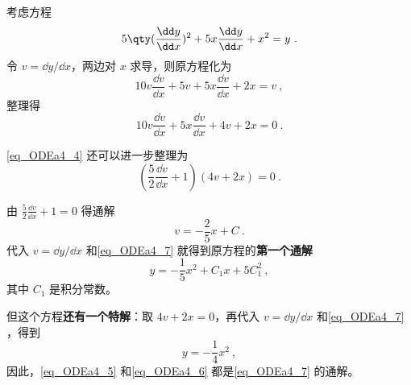 \begin{example}{}\label{ex_ODEa4_1}
考虑方程
\begin{equation}\label{eq_ODEa4_7}
5\qty(\frac{\dd y}{\dd x})^2+5x\frac{\dd y}{\dd x}+x^2=y~.
\end{equation}
令 $v=\dd y/\dd x$，两边对 $x$ 求导，则原方程化为
\begin{equation}\label{eq_ODEa4_8}
10v\frac{\dd v}{\dd x}+5v+5x\frac{\dd v}{\dd x}+2x=v~,
\end{equation}
整理得
\begin{equation}\label{eq_ODEa4_4}
10v\frac{\dd v}{\dd x}+5x\frac{\dd v}{\dd x}+4v+2x=0~.
\end{equation}

\autoref{eq_ODEa4_4} 还可以进一步整理为
\begin{equation}
(\frac{5}{2}\frac{\dd v}{\dd x}+1)(4v+2x)=0~.
\end{equation}

由 $\frac{5}{2}\frac{\dd v}{\dd x}+1=0$ 得通解
\begin{equation}\label{eq_ODEa4_9}
v=-\frac{2}{5}x+C~.
\end{equation}
代入 $v=\dd y/\dd x$ 和\autoref{eq_ODEa4_7} 就得到原方程的\textbf{第一个通解}
\begin{equation}\label{eq_ODEa4_5}
y=-\frac{1}{5}x^2+C_1x+5C_1^2~,
\end{equation}
其中 $C_1$ 是积分常数。

但这个方程\textbf{还有一个特解}：取 $4v+2x=0$，再代入 $v=\dd y/\dd x$ 和\autoref{eq_ODEa4_7} ，得到
\begin{equation}\label{eq_ODEa4_6}
y=-\frac{1}{4}x^2~,
\end{equation}
因此，\autoref{eq_ODEa4_5} 和\autoref{eq_ODEa4_6} 都是\autoref{eq_ODEa4_7} 的通解。




\end{example}

